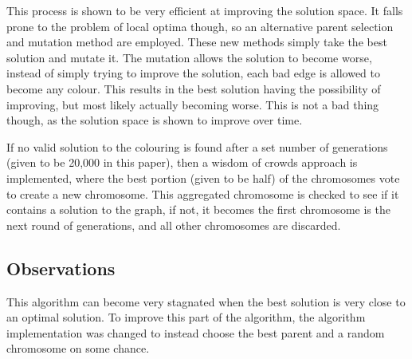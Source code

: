 This process is shown to be very efficient at improving the solution space. It falls prone to the problem of local optima though, so an alternative parent selection and mutation method are employed. These new methods simply take the best solution and mutate it. The mutation allows the solution to become worse, instead of simply trying to improve the solution, each bad edge is allowed to become any colour. This results in the best solution having the possibility of improving, but most likely actually becoming worse. This is not a bad thing though, as the solution space is shown to improve over time. 

If no valid solution to the colouring is found after a set number of generations (given to be 20,000 in this paper), then a wisdom of crowds approach is implemented, where the best portion (given to be half) of the chromosomes vote to create a new chromosome. This aggregated chromosome is checked to see if it contains a solution to the graph, if not, it becomes the first chromosome is the next round of generations, and all other chromosomes are discarded. 

\subsection{Observations}
This algorithm can become very stagnated when the best solution is very close to an optimal solution. To improve this part of the algorithm, the algorithm implementation was changed to instead choose the best parent and a random chromosome on some chance. 